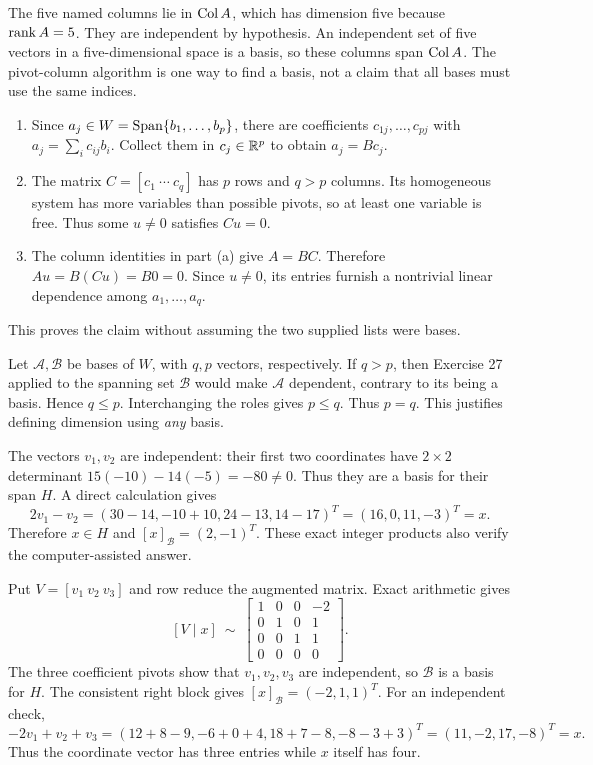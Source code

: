 The five named columns lie in $\operatorname{Col} A$, which has dimension five because
$\operatorname{rank} A=5$. They are independent by hypothesis. An independent set
of five vectors in a five-dimensional space is a basis, so these columns
span $\operatorname{Col} A$. The pivot-column algorithm is one way to find a basis,
not a claim that all bases must use the same indices.

\begin{enumerate}[label=(\alph*)]
\item Since $a_j\in W=\operatorname{Span}\{b_1,\ldots,b_p\}$,
there are coefficients $c_{1j},\ldots,c_{pj}$ with
$a_j=\sum_i c_{ij}b_i$. Collect them in $c_j\in\mathbb{R}^p$ to obtain
$a_j=Bc_j$.
\item The matrix $C=[c_1\ \cdots\ c_q]$ has $p$ rows and $q>p$
columns. Its homogeneous system has more variables than possible pivots,
so at least one variable is free. Thus some $u\ne0$ satisfies $Cu=0$.
\item The column identities in part (a) give $A=BC$. Therefore
$Au=B(Cu)=B0=0$. Since $u\ne0$, its entries furnish a nontrivial
linear dependence among $a_1,\ldots,a_q$.
\end{enumerate}
This proves the claim without assuming the two supplied lists were bases.

Let $\mathcal A,\mathcal B$ be bases of $W$, with $q,p$ vectors,
respectively. If $q>p$, then Exercise 27 applied to the spanning set
$\mathcal B$ would make $\mathcal A$ dependent, contrary to its being a
basis. Hence $q\le p$. Interchanging the roles gives $p\le q$.
Thus $p=q$. This justifies defining dimension using \emph{any} basis.

The vectors $v_1,v_2$ are independent: their first two coordinates have
$2\times2$ determinant $15(-10)-14(-5)=-80\ne0$.
Thus they are a basis for their span $H$.
A direct calculation gives
\[
 2v_1-v_2=(30-14,-10+10,24-13,14-17)^T=(16,0,11,-3)^T=x.
\]
Therefore $x\in H$ and $\boxed{[x]_{\mathcal B}=(2,-1)^T}$.
These exact integer products also verify the computer-assisted answer.

Put $V=[v_1\ v_2\ v_3]$ and row reduce the augmented matrix.
Exact arithmetic gives
\[
 [V\mid x]\ \sim\
 \left[\begin{array}{rrr|r}1&0&0&-2\\0&1&0&1\\0&0&1&1\\0&0&0&0\end{array}\right].
\]
The three coefficient pivots show that $v_1,v_2,v_3$ are independent,
so $\mathcal B$ is a basis for $H$. The consistent right block gives
$[x]_{\mathcal B}=\boxed{(-2,1,1)^T}$.
For an independent check,
\[
 -2v_1+v_2+v_3=(12+8-9,-6+0+4,18+7-8,-8-3+3)^T
 =(11,-2,17,-8)^T=x.
\]
Thus the coordinate vector has three entries while $x$ itself has four.
